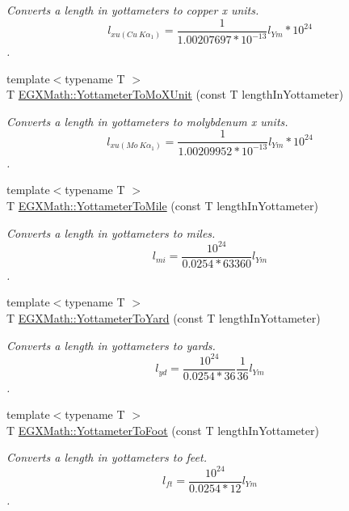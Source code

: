 \begin{DoxyCompactItemize}
\begin{DoxyCompactList}\small\item\em Converts a length in yottameters to copper x units. \[ l_{xu(Cu\ K\alpha_1)}= \frac{1}{1.00207697*10^{-13}} l_{Ym} * 10^{24}\]. \end{DoxyCompactList}\item 
{\footnotesize template$<$typename T $>$ }\\T \mbox{\hyperlink{group___e_g_x_math-_conversions-_length_conversions-_s_i-_yottameter-_non-_s_i_ga545da9526f7a62f5ca7d1800faf17d1d}{E\+G\+X\+Math\+::\+Yottameter\+To\+Mo\+X\+Unit}} (const T length\+In\+Yottameter)
\begin{DoxyCompactList}\small\item\em Converts a length in yottameters to molybdenum x units. \[ l_{xu(Mo\ K\alpha_1)}=\frac{1}{1.00209952*10^{-13}} l_{Ym} * 10^{24}\]. \end{DoxyCompactList}\item 
{\footnotesize template$<$typename T $>$ }\\T \mbox{\hyperlink{group___e_g_x_math-_conversions-_length_conversions-_s_i-_yottameter-_imperial_ga4ca41b9b222f31926417df30e0539b50}{E\+G\+X\+Math\+::\+Yottameter\+To\+Mile}} (const T length\+In\+Yottameter)
\begin{DoxyCompactList}\small\item\em Converts a length in yottameters to miles. \[ l_{mi}=\frac{10^{24}}{0.0254 * 63360} l_{Ym} \]. \end{DoxyCompactList}\item 
{\footnotesize template$<$typename T $>$ }\\T \mbox{\hyperlink{group___e_g_x_math-_conversions-_length_conversions-_s_i-_yottameter-_imperial_ga87f19dee341e81a7bb72bf4a5134935f}{E\+G\+X\+Math\+::\+Yottameter\+To\+Yard}} (const T length\+In\+Yottameter)
\begin{DoxyCompactList}\small\item\em Converts a length in yottameters to yards. \[ l_{yd}= \frac{10^{24}}{0.0254 * 36} \frac{1}{36} l_{Ym} \]. \end{DoxyCompactList}\item 
{\footnotesize template$<$typename T $>$ }\\T \mbox{\hyperlink{group___e_g_x_math-_conversions-_length_conversions-_s_i-_yottameter-_imperial_gae693078fe8f9b2ca717732916dcf28d7}{E\+G\+X\+Math\+::\+Yottameter\+To\+Foot}} (const T length\+In\+Yottameter)
\begin{DoxyCompactList}\small\item\em Converts a length in yottameters to feet. \[ l_{ft}= \frac{10^{24}}{0.0254 * 12} l_{Ym} \]. \end{DoxyCompactList}\item 

\end{DoxyCompactItemize}
